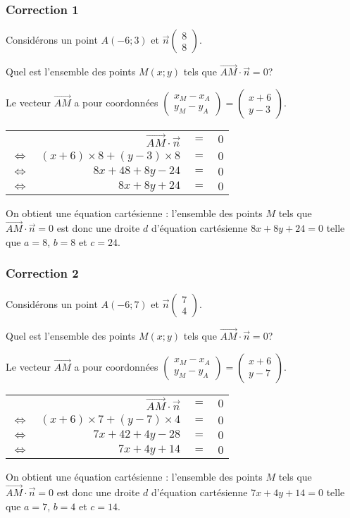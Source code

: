 \documentclass[15pt, mathserif]{beamer}
\newenvironment{Eq}{\begin{center}\begin{tabular}{rrcl}}{\end{tabular}\end{center}}
\newcommand{\ligneq}[2]{$\Longleftrightarrow$ & $#1$ & $=$ & $#2$ \\}
\newcommand{\Ligneq}[2]{ & $#1$ & $=$ & $#2$ \\}
\begin{document}
\begin{frame}
\vspace{-10mm}
	\frametitle{Correction 1}
\vspace{0.5cm} 
 Considérons un point $A(-6;3)$ et $\vec{n} \begin{pmatrix}
  8\\ 
 8 
 \end{pmatrix}$. 
 
 Quel est l'ensemble des points $M(x;y)$ tels que $\overrightarrow{AM} \cdot \vec{n}=0$?
 
 Le vecteur $\overrightarrow{AM}$ a pour coordonnées $\begin{pmatrix} 
 x_M-x_A \\ 
  y_M-y_A 
 \end{pmatrix}=\begin{pmatrix} x+6 \\ 
 y -3 
 \end{pmatrix}$. 
 
 \begin{Eq} 
 \Ligneq{\overrightarrow{AM} \cdot \vec{n}}{0} 
 \ligneq{(x+6) \times 8 + (y-3) \times8}{0} 
 \ligneq{8x+48+8y-24}{0} 
 \ligneq{8x+8y+24}{0} 
 \end{Eq} 
 
 On obtient une équation cartésienne : l'ensemble des points $M$ tels que $\overrightarrow{AM}\cdot \vec{n}=0$ est donc une droite $d$ d'équation cartésienne $8x+8y+24=0$ telle que $a=8$, $b=8$ et $c=24$. \end{frame}


\begin{frame}
\vspace{-10mm}
	\frametitle{Correction 2}
\vspace{0.5cm} 
 Considérons un point $A(-6;7)$ et $\vec{n} \begin{pmatrix}
  7\\ 
 4 
 \end{pmatrix}$. 
 
 Quel est l'ensemble des points $M(x;y)$ tels que $\overrightarrow{AM} \cdot \vec{n}=0$?
 
 Le vecteur $\overrightarrow{AM}$ a pour coordonnées $\begin{pmatrix} 
 x_M-x_A \\ 
  y_M-y_A 
 \end{pmatrix}=\begin{pmatrix} x+6 \\ 
 y -7 
 \end{pmatrix}$. 
 
 \begin{Eq} 
 \Ligneq{\overrightarrow{AM} \cdot \vec{n}}{0} 
 \ligneq{(x+6) \times 7 + (y-7) \times4}{0} 
 \ligneq{7x+42+4y-28}{0} 
 \ligneq{7x+4y+14}{0} 
 \end{Eq} 
 
 On obtient une équation cartésienne : l'ensemble des points $M$ tels que $\overrightarrow{AM}\cdot \vec{n}=0$ est donc une droite $d$ d'équation cartésienne $7x+4y+14=0$ telle que $a=7$, $b=4$ et $c=14$. \end{frame}
\end{document}
